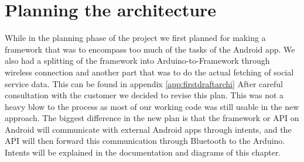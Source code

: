\section{Planning the architecture}

While in the planning phase of the project we first planned for making a framework that was to encompass too much of the tasks of the Android app. We also had a splitting of the framework into Arduino-to-Framework through wireless connection and another part that was to do the actual fetching of social service data. This can be found in appendix \ref{app:firstdraftarchi}
After careful consultation with the customer we decided to revise this plan. This was not a heavy blow to the process as most of our working code was still usable in the new approach. The biggest difference in the new plan is that the framework or API on Android will communicate with external Android apps through intents, and the API will then forward this communication through Bluetooth to the Arduino. Intents will be explained in the documentation and diagrams of this chapter.
